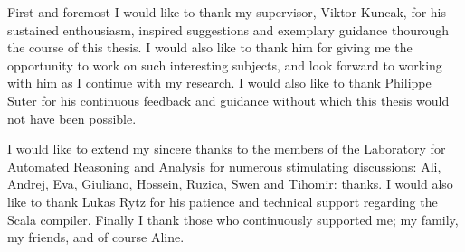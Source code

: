 First and foremost I would like to thank my supervisor, Viktor Kuncak, for his
sustained enthousiasm, inspired suggestions and exemplary guidance thourough
the course of this thesis. I would also like to thank him for giving me the
opportunity to work on such interesting subjects, and look forward to working
with him as I continue with my research. I would also like to thank Philippe
Suter for his continuous feedback and guidance without which this thesis would
not have been possible.

I would like to extend my sincere thanks to the members of the Laboratory for
Automated Reasoning and Analysis for numerous stimulating discussions: Ali,
Andrej, Eva, Giuliano, Hossein, Ruzica, Swen and Tihomir: thanks. I would also
like to thank Lukas Rytz for his patience and technical support regarding the
Scala compiler. Finally I thank those who continuously supported me; my
family, my friends, and of course Aline.

